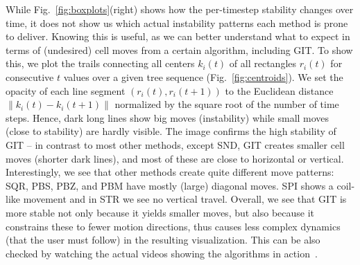 While Fig.~\ref{fig:boxplots}(right) shows how the per-timestep stability changes over time, it does not show us which actual instability patterns each method is prone to deliver. Knowing this is useful, as we can better understand what to expect in terms of (undesired) cell moves from a certain algorithm, including GIT. To show this, we plot the trails connecting all centers $k_i(t)$ of all rectangles $r_i(t)$ for consecutive $t$ values over a given tree sequence (Fig.~\ref{fig:centroids}). We set the opacity of each line segment $(r_i(t), r_i(t+1))$ to the Euclidean distance $\| k_i(t) - k_i(t+1)\|$ normalized by the square root of the number of time steps. Hence, dark long lines show big moves (instability) while small moves (close to stability) are hardly visible. The image confirms the high stability of GIT --  in contrast to most other methods, except SND, GIT creates smaller cell moves (shorter dark lines), and most of these are close to horizontal or vertical. Interestingly, we see that other methods create quite different move patterns: SQR, PBS, PBZ, and PBM have mostly (large) diagonal moves. SPI shows a coil-like movement and in STR we see no vertical travel. Overall, we see that GIT is more stable not only because it yields smaller moves, but also because it constrains these to fewer motion directions, thus causes less complex dynamics (that the user must follow) in the resulting visualization. This can be also checked by watching the actual videos showing the algorithms in action~\citep{git-benchmark}.

